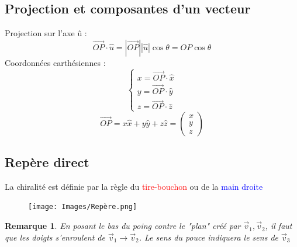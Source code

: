 \documentclass{article}
\newtheorem{remark}{Remarque}[section]
\begin{document}
\subsection{Projection et composantes d'un vecteur}
Projection sur l'axe û :
\[ \overrightarrow{OP} \cdot \hat{u} = |\overrightarrow{OP}| |\hat{u}|\cos{\theta} = OP\cos{\theta} \]
Coordonnées carthésiennes :
\begin{equation}
    \begin{cases}
        x = \overrightarrow{OP} \cdot \hat{x}\\
        y = \overrightarrow{OP} \cdot \hat{y}\\
        z = \overrightarrow{OP} \cdot \hat{z}
    \end{cases}
\end{equation}
\[ \overrightarrow{OP} = x\hat{x} + y\hat{y} + z\hat{z} = \begin{pmatrix}
    x \\
    y \\
    z
\end{pmatrix} \]
\subsection{Repère direct}
La chiralité est définie par la règle du \textcolor{red}{tire-bouchon} ou de la \textcolor{blue}{main droite}
\begin{figure}
    \centering
    \texttt{[image: Images/Repère.png]}
    \label{fig:repere}
\end{figure}
\begin{remark}
En posant le bas du poing contre le "plan" créé par \( \overrightarrow{v}_1, \overrightarrow{v}_2 \), il faut que les doigts s'enroulent de \( \overrightarrow{v}_1 \rightarrow \overrightarrow{v}_2 \). Le sens du pouce indiquera le sens de \( \overrightarrow{v}_3 \)\newline \newline \newline\newline\newline\newline\newline\newline
\end{remark}
\end{document}
